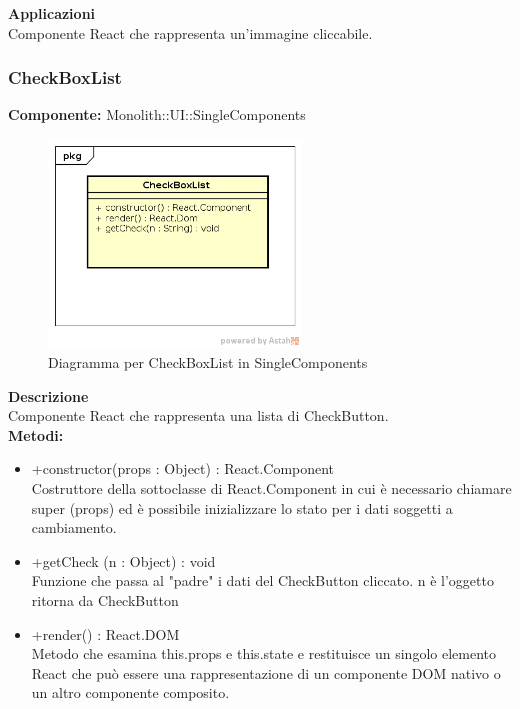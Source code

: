 \textbf{Applicazioni}\\
Componente React che rappresenta un'immagine cliccabile.\\ 


\clearpage

\subsubsection{CheckBoxList}
\textbf{Componente:}  Monolith::UI::SingleComponents\\
   \FloatBarrier
   \begin{figure}[ht]
   \centering
   \includegraphics[width=0.6\textwidth]{img/single-CheckBoxList.png}
   \caption{{Diagramma per CheckBoxList in SingleComponents}}
\end{figure}
\FloatBarrier
\textbf{Descrizione}\\
Componente React che rappresenta una lista di CheckButton. \\
\textbf{Metodi:} 
\begin{itemize}
\item +constructor(props : Object) : React.Component 
\\
Costruttore della sottoclasse di React.Component in cui è necessario chiamare super (props) ed è possibile inizializzare lo stato per i dati soggetti a cambiamento.

\item +getCheck (n : Object) : void \\
Funzione che passa al "padre" i dati del CheckButton cliccato. 
n è l'oggetto ritorna da CheckButton

\item +render() : React.DOM 
\\
Metodo che esamina this.props e this.state e restituisce un singolo elemento React che può essere una rappresentazione di un componente DOM nativo o un altro componente composito.

\end{itemize}

